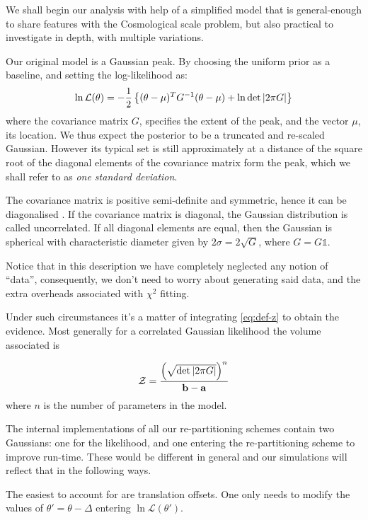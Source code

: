 \documentclass[usenatbib]{mnras}
\begin{document}
We shall begin our analysis with help of a simplified model that is
general-enough to share features with the Cosmological scale
problem, but also practical to investigate in depth, with multiple
variations.

Our original model is a Gaussian peak. By choosing the uniform
prior as a baseline, and setting the log-likelihood as:
\begin{equation}
  \ln {\cal L}(\theta) = - \frac{1}{2} \left\{(\theta - \mu)^{T}G^{-1}(\theta-\mu)  + \ln \det \left| 2\pi G\right| \right\}
\end{equation}
where the covariance matrix \(G\), specifies the extent of the peak,
and the vector \(\mu\), its location. We thus expect the posterior
to be a truncated and re-scaled Gaussian. However its typical set
is still approximately at a distance of the square root of the
diagonal elements of the covariance matrix form the peak, which we
shall refer to as \emph{one standard deviation}.

The covariance matrix is positive semi-definite and symmetric,
hence it can be diagonalised \citep{taboga2017lectures}. If the
covariance matrix is diagonal, the Gaussian distribution is called
uncorrelated. If all diagonal elements are equal, then the
Gaussian is spherical with characteristic diameter given by \(2
	\sigma = 2\sqrt{G}\), where \(G = G \mathds{1}\).

Notice that in this description we have completely neglected any
notion of ``data'', consequently, we don't need to worry about
generating said data, and the extra overheads associated with
\(\chi^2\) fitting.

Under such circumstances it's a matter of integrating \ref{eq:def-z}
to obtain the evidence. Most generally for a correlated Gaussian
likelihood the volume associated is 

\begin{equation}\label{eq:evidence}
   {\cal Z} = \frac{\left( \sqrt{ \det \left| 2\pi G \right|} \right)^{n}}{\mathbf{b}-\mathbf{a}}  
\end{equation}
where \(n\) is the number of parameters in the model.

The internal implementations of all our re-partitioning schemes
contain two Gaussians: one for the likelihood, and one
entering the re-partitioning scheme to improve run-time. These
would be different in general and our simulations will reflect
that in the following ways.

The easiest to account for are translation offsets. One only needs to
modify the values of \(\theta' = \theta - \Delta\) entering \(\ln
	\mathcal{L}(\theta')\). 
\end{document}
